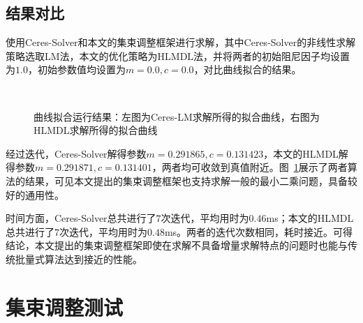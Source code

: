 \subsection{结果对比}

使用Ceres-Solver和本文的集束调整框架进行求解，其中Ceres-Solver的非线性求解策略选取LM法，本文的优化策略为HLMDL法，并将两者的初始阻尼因子均设置为$1.0$，初始参数值均设置为$m=0.0,c=0.0$，对比曲线拟合的结果。

\begin{figure}[htb!]
    \centering
    ~
    \caption{曲线拟合运行结果：左图为Ceres-LM求解所得的拟合曲线，右图为HLMDL求解所得的拟合曲线}
    \label{fig:curve}
\end{figure}

经过迭代，Ceres-Solver解得参数$m=0.291865,c=0.131423$，本文的HLMDL解得参数$m=0.291871,c=0.131401$，两者均可收敛到真值附近。图~\ref{fig:curve}展示了两者算法的结果，可见本文提出的集束调整框架也支持求解一般的最小二乘问题，具备较好的通用性。

时间方面，Ceres-Solver总共进行了$7$次迭代，平均用时为$0.46$ms；本文的HLMDL总共进行了$7$次迭代，平均用时为$0.48$ms。两者的迭代次数相同，耗时接近。可得结论，本文提出的集束调整框架即使在求解不具备增量求解特点的问题时也能与传统批量式算法达到接近的性能。

\section{集束调整测试}

